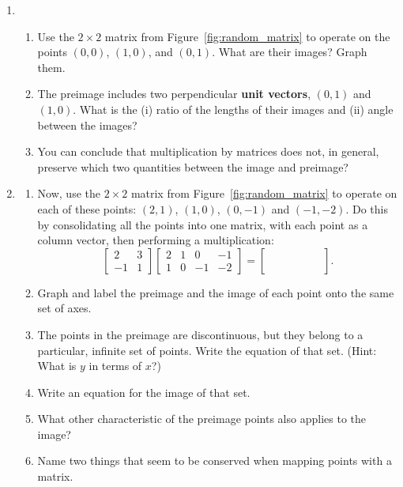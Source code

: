\documentclass[../textbook.tex]{subfiles}
\begin{document}
\begin{enumerate}
\item \begin{enumerate}
\item Use the $2\times 2$ matrix from Figure~\ref{fig:random_matrix} to operate on the points $(0,0)$, $(1,0)$, and $(0,1)$. What are their images? Graph them.
\item The preimage includes two perpendicular \textbf{unit vectors}, $(0,1)$ and $(1,0)$. What is the (i) ratio of the lengths of their images and (ii) angle between the images?
\item You can conclude that multiplication by matrices does not, in general, preserve which two quantities between the image and preimage?
\end{enumerate}
\item \label{prob:consolidate_matrix} \begin{enumerate}
\item Now, use the $2\times 2$ matrix from Figure~\ref{fig:random_matrix} to operate on each of these points: $(2,1)$, $(1,0)$, $(0,-1)$ and $(-1,-2)$. Do this by consolidating all the points into one matrix, with each point as a column vector, then performing a multiplication:
$$\left[\begin{array}{cc}2 & 3 \\ -1 & 1 \end{array}\right]
\left[\begin{array}{cccc}2 & 1 & 0 & -1 \\ 1 & 0 & -1 & -2\end{array}\right]
=\left[\begin{array}{cccc}\phantom{0} & \phantom{0} & \phantom{0} & \phantom{0} \\ \phantom{0}\end{array}\right].$$
\item Graph and label the preimage and the image of each point onto the same set of axes.
\item The points in the preimage are discontinuous, but they belong to a particular, infinite set of points. Write the equation of that set. (Hint: What is $y$ in terms of $x$?)
\item Write an equation for the image of that set.
\item What other characteristic of the preimage points also applies to the image?
\item Name two things that seem to be conserved when mapping points with a matrix.
\end{enumerate}
\setcounter{problem_i}{\value{enumi}}
\end{enumerate}
\end{document}
